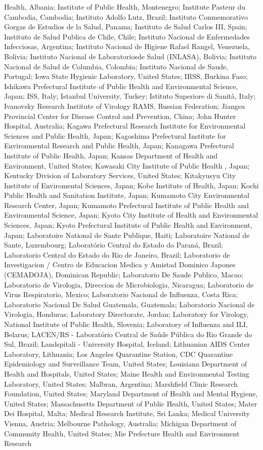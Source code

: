 Health, Albania; Institute of Public Health, Montenegro; Institute Pasteur du Cambodia, Cambodia; Instituto Adolfo Lutz, Brazil; Instituto Conmemorativo Gorgas de Estudios de la Salud, Panama; Instituto de Salud Carlos III, Spain; Instituto de Salud Publica de Chile, Chile; Instituto Nacional de Enfermedades Infecciosas, Argentina; Instituto Nacional de Higiene Rafael Rangel, Venezuela, Bolivia; Instituto Nacional de Laboratoriosde Salud (INLASA), Bolivia; Instituto Nacional de Salud de Columbia, Colombia; Instituto Nacional de Saude, Portugal; Iowa State Hygienic Laboratory, United States; IRSS, Burkina Faso; Ishikawa Prefectural Institute of Public Health and Environmental Science, Japan; ISS, Italy; Istanbul University, Turkey; Istituto Superiore di Sanità, Italy; Ivanovsky Research Institute of Virology RAMS, Russian Federation; Jiangsu Provincial Center for Disease Control and Prevention, China; John Hunter Hospital, Australia; Kagawa Prefectural Research Institute for Environmental Sciences and Public Health, Japan; Kagoshima Prefectural Institute for Environmental Research and Public Health, Japan; Kanagawa Prefectural Institute of Public Health, Japan; Kansas Department of Health and Environment, United States; Kawasaki City Institute of Public Health , Japan; Kentucky Division of Laboratory Services, United States; Kitakyusyu City Institute of Enviromental Sciences, Japan; Kobe Institute of Health, Japan; Kochi Public Health and Sanitation Institute, Japan; Kumamoto City Environmental Research Center, Japan; Kumamoto Prefectural Institute of Public Health and Environmental Science, Japan; Kyoto City Institute of Health and Environmental Sciences, Japan; Kyoto Prefectural Institute of Public Health and Environment, Japan; Laboratoire National de Sante Publique, Haiti; Laboratoire National de Sante, Luxembourg; Laboratório Central do Estado do Paraná, Brazil; Laboratorio Central do Estado do Rio de Janeiro, Brazil; Laboratorio de Investigacion / Centro de Educacion Medica y Amistad Dominico Japones (CEMADOJA), Dominican Republic; Laboratorio De Saude Publico, Macao; Laboratorio de Virologia, Direccion de Microbiologia, Nicaragua; Laboratorio de Virus Respiratorio, Mexico; Laboratorio Nacional de Influenza, Costa Rica; Laboratorio Nacional De Salud Guatemala, Guatemala; Laboratorio Nacional de Virologia, Honduras; Laboratory Directorate, Jordan; Laboratory for Virology, National Institute of Public Health, Slovenia; Laboratory of Influenza and ILI, Belarus; LACEN/RS - Laboratório Central de Saúde Pública do Rio Grande do Sul, Brazil; Landspitali - University Hospital, Iceland; Lithuanian AIDS Center Laboratory, Lithuania; Los Angeles Quarantine Station, CDC Quarantine Epidemiology and Surveillance Team, United States; Louisiana Department of Health and Hospitals, United States; Maine Health and Environmental Testing Laboratory, United States; Malbran, Argentina; Marshfield Clinic Research Foundation, United States; Maryland Department of Health and Mental Hygiene, United States; Massachusetts Department of Public Health, United States; Mater Dei Hospital, Malta; Medical Research Institute, Sri Lanka; Medical University Vienna, Austria; Melbourne Pathology, Australia; Michigan Department of Community Health, United States; Mie Prefecture Health and Environment Research 